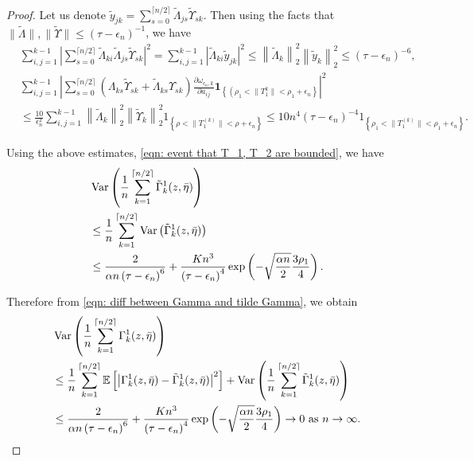 \documentclass[12pt]{amsart}
\theoremstyle{plain}
\theoremstyle{definition}
\newcommand{\Var}{\operatorname{Var}}
\begin{document}
\begin{proof}
Let us denote $\tilde{y}_{j k}=\sum_{s=0} ^{\lceil n/2 \rceil} \tilde{\Lambda}_{j s} \tilde{\Upsilon}_{s k}$. Then using the facts that $\|\tilde{\Lambda}\|,\|\tilde{\Upsilon}\| \leq\left(\tau-\epsilon_n\right)^{-1}$, we have
\begin{align*}
    &\sum_{i,j=1}^{k-1} \left|\sum_{s=0} ^{\lceil n/2 \rceil} \tilde{\Lambda}_{k i} \tilde{\Lambda}_{j s} \tilde{\Upsilon}_{s k}\right|^2=\sum_{i,j=1}^{k-1} \left|\tilde{\Lambda}_{k i} \tilde{y}_{j k}\right|^2 \leq\left\|\tilde{\Lambda}_k\right\|_2^2\left\|\tilde{y}_k\right\|_2^2 \leq\left(\tau-\epsilon_n\right)^{-6}, \\
    &\sum_{i,j=1}^{k-1} \left|\sum_{s=0} ^{\lceil n/2 \rceil}\left(\Lambda_{ks} \tilde{\Upsilon}_{s k}+\tilde{\Lambda}_{ks} \Upsilon_{s k}\right) \frac{\partial \omega_{\epsilon_n, k}}{\partial a_{i j}} \mathbf{1}_{\left\{\left(\rho_1<\|T_1^k\|<\rho_1+\epsilon_n\right\}\right.}\right|^2 \\
  &\leq \frac{10}{\epsilon_n^2} \sum_{i,j=1}^{k-1} \left\|\tilde{\Lambda}_k\right\|_2^2\left\|\tilde{\Upsilon}_k\right\|_2^2 1_{\left\{\rho<\|T_{1}^{(k)}\|<\rho+\epsilon_n\right\}} \leq 10 n^4\left(\tau-\epsilon_n\right)^{-4} 1_{\left\{\rho_1<\|T_{1}^{(k)}\|<\rho_1+\epsilon_n\right\}} .
\end{align*}

Using the above estimates, \eqref{eqn: event that T_1, T_2 are bounded}, we have
\begin{align}
    &\Var\left(\frac{1}{n} \sum_{k=1}^{\lceil n/2 \rceil} \tilde{\Gamma}_{k}^1(z, \bar{\eta})\right) \notag\\
    &\leq \frac{1}{n} \sum_{k=1}^{\lceil n/2 \rceil} \Var\left(\tilde{\Gamma}_{k}^1(z, \bar{\eta})\right)\notag\\
    &\leq \frac{2}{\alpha n\left(\tau-\epsilon_n\right)^6}+\frac{K n^3}{\left(\tau-\epsilon_n\right)^4} \exp \left(-\sqrt{\frac{\alpha n}{2} }\frac{3 \rho_{1}}{4}\right).\notag
\end{align}

Therefore from \eqref{eqn: diff between Gamma and tilde Gamma}, we obtain
\begin{align}
    &  \Var\left(\frac{1}{n} \sum_{k=1}^{\lceil n/2 \rceil} \Gamma_{k}^1(z, \bar{\eta})\right) \notag\\
    &\leq \frac{1}{n} \sum_{k=1}^{\lceil n/2 \rceil} \mathbb{E}\left[\left|\Gamma_{k}^1(z, \bar{\eta})-\tilde{\Gamma}_{k}^1(z, \bar{\eta})\right|^2\right]+\Var\left(\frac{1}{n} \sum_{k=1}^{\lceil n/2 \rceil} \tilde{\Gamma}_{k}^1(z, \bar{\eta})\right) \notag\\
    &\leq \frac{2}{\alpha n\left(\tau-\epsilon_n\right)^6}+\frac{K n^3}{\left(\tau-\epsilon_n\right)^4} \exp \left(-\sqrt{\frac{\alpha n}{2} }\frac{3 \rho_{1}}{4}\right) \rightarrow 0 \text{ as } n\rightarrow \infty.\notag
\end{align}


\end{proof}
\end{document}
